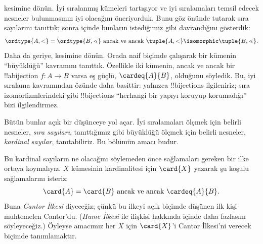 


 kesimine dönün. İyi sıralanmış kümeleri
tartışıyor ve iyi sıralamaları temsil edecek nesneler bulunmasının iyi
olacağını öneriyorduk. Bunu göz önünde tutarak sıra sayılarını tanıttık;
sonra  içinde bunların
istediğimiz gibi davrandığını gösterdik:
\[
	\ordtype{A, <} = \ordtype{B, \lessdot}
	\text{ ancak ve ancak } \tuple{A, <} \isomorphic \tuple{B, \lessdot}.
\]
Daha da geriye,  kesimine dönün. Orada naif
biçimde çalışarak bir kümenin ``büyüklüğü'' kavramını tanıttık. Özellikle
iki kümenin, ancak ve ancak bir !!a{bijection} $f\colon A\to B$ varsa
eş güçlü, $\cardeq{A}{B}$, olduğunu söyledik. Bu, iyi sıralama kavramından
özünde daha basittir: yalnızca !!{bijection}s ilgileniriz; sıra
izomorfizmlerindeki gibi !!{bijection}s ``herhangi bir yapıyı koruyup
korumadığı'' bizi ilgilendirmez.

Bütün bunlar açık bir düşünceye yol açar. İyi sıralamaları ölçmek için
belirli nesneler, \emph{sıra sayıları}, tanıttığımız gibi büyüklüğü ölçmek
için belirli nesneler, \emph{kardinal sayılar}, tanıtabiliriz. Bu bölümün
amacı budur.

Bu kardinal sayıların ne olacağını söylemeden önce sağlamaları gereken bir
ilke ortaya koymalıyız. $X$ kümesinin kardinalitesi için $\card{X}$ yazarak
şu koşulu sağlamalarını isteriz:
\[
	\card{A} = \card{B} \text{ ancak ve ancak } \cardeq{A}{B}.
\]
Buna \emph{Cantor İlkesi} diyeceğiz; çünkü bu ilkeyi açık biçimde düşünen
ilk kişi muhtemelen Cantor'du. (\emph{Hume İlkesi} ile ilişkisi hakkında
 içinde daha fazlasını söyleyeceğiz.) Öyleyse amacımız her
$X$ için $\card{X}$'i Cantor İlkesi'ni verecek biçimde tanımlamaktır.

